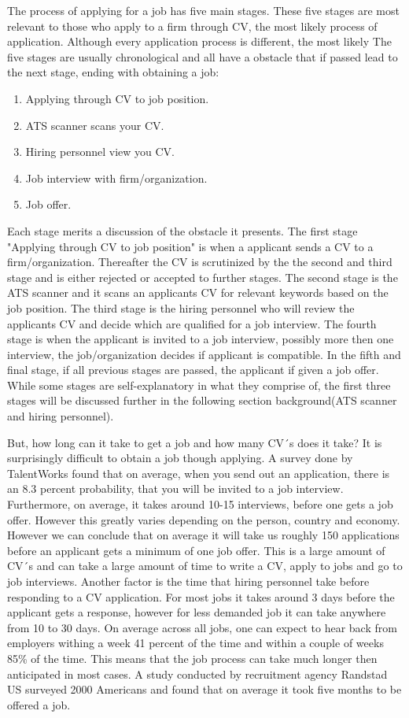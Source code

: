 The process of applying for a job has five main stages.
These five stages are most relevant to those who apply to a firm through CV, the most likely process of application.
Although every application process is different, the most likely 
The five stages are usually chronological and all have a obstacle that if passed lead to the next stage, ending with obtaining a job:
\begin{enumerate}
   \item Applying through CV to job position.
   \item ATS scanner scans your CV.
   \item Hiring personnel view you CV.
   \item Job interview with firm/organization.
   \item Job offer.
\end{enumerate}
Each stage merits a discussion of the obstacle it presents.
The first stage "Applying through CV to job position" is when a applicant sends a CV to a firm/organization.
Thereafter the CV is scrutinized by the the second and third stage and is either rejected or accepted to further stages.
The second stage is the ATS scanner and it scans an applicants CV for relevant keywords based on the job position.
The third stage is the hiring personnel who will review the applicants CV and decide which are qualified for a job interview.
The fourth stage is when the applicant is invited to a job interview, possibly more then one interview, the job/organization decides if applicant is compatible.
In the fifth and final stage, if all previous stages are passed, the applicant if given a job offer.
While some stages are self-explanatory in what they comprise of, the first three stages will be discussed further in the following section background(ATS scanner and hiring personnel).

But, how long can it take to get a job and how many CV´s does it take?
It is surprisingly difficult to obtain a job though applying.
A survey done by TalentWorks found that on average, when you send out an application, there is an 8.3 percent probability, that you will be invited to a job interview. 
Furthermore, on average, it takes around 10-15 interviews, before one gets a job offer. 
However this greatly varies depending on the person, country and economy.
However we can conclude that on average it will take us roughly 150 applications before an applicant gets a minimum of one job offer.\cite{HR-sales}
This is a large amount of CV´s and can take a large amount of time to write a CV, apply to jobs and go to job interviews.
Another factor is the time that hiring personnel take before responding to a CV application.
For most jobs it takes around 3 days before the applicant gets a response, however for less demanded job it can take anywhere from 10 to 30 days.\cite{HR-sales}
On average across all jobs, one can expect to hear back from employers withing a week 41 percent of the time and within a couple of weeks 85\% of the time.
This means that the job process can take much longer then anticipated in most cases.
A study conducted by recruitment agency Randstad US surveyed 2000 Americans and found that on average it took five months to be offered a job.\cite{5_month_for_a_job}

